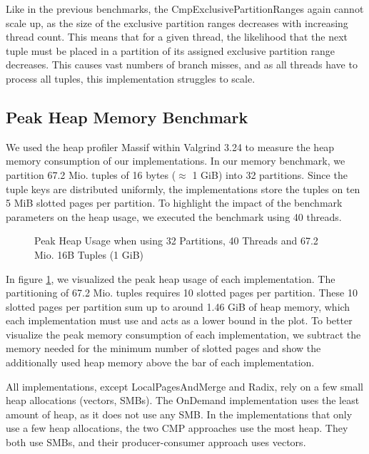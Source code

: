 Like in the previous benchmarks, the CmpExclusivePartitionRanges again cannot scale up, as the size of the exclusive partition ranges decreases with increasing thread count.
This means that for a given thread, the likelihood that the next tuple must be placed in a partition of its assigned exclusive partition range decreases.
This causes vast numbers of branch misses, and as all threads have to process all tuples, this implementation struggles to scale.

\subsection{Peak Heap Memory Benchmark}
We used the heap profiler Massif within Valgrind 3.24 to measure the heap memory consumption of our implementations.
In our memory benchmark, we partition 67.2 Mio.
tuples of 16 bytes ($\approx$ 1 GiB) into 32 partitions.
Since the tuple keys are distributed uniformly, the implementations store the tuples on ten 5 MiB slotted pages per partition.
To highlight the impact of the benchmark parameters on the heap usage, we executed the benchmark using 40 threads.

\begin{figure}[h]
  \centering
  \resizebox{\linewidth}{!}{}
  \caption[Peak Heap Memory Benchmark Plot]{Peak Heap Usage when using 32 Partitions, 40 Threads and 67.2 Mio.
    16B Tuples (1 GiB)} \label{plot-heap-16B-P32-Th40} \end{figure}
In figure \ref{plot-heap-16B-P32-Th40}, we visualized the peak heap usage of each implementation.
The partitioning of 67.2 Mio.
tuples requires 10 slotted pages per partition.
These 10 slotted pages per partition sum up to around 1.46 GiB of heap memory, which each implementation must use and acts as a lower bound in the plot.
To better visualize the peak memory consumption of each implementation, we subtract the memory needed for the minimum number of slotted pages and show the additionally used heap memory above the bar of each implementation.

All implementations, except LocalPagesAndMerge and Radix, rely on a few small heap allocations (vectors, SMBs).
The OnDemand implementation uses the least amount of heap, as it does not use any \ac{SMB}.
In the implementations that only use a few heap allocations, the two \ac{CMP} approaches use the most heap.
They both use \acp{SMB}, and their producer-consumer approach uses vectors.

